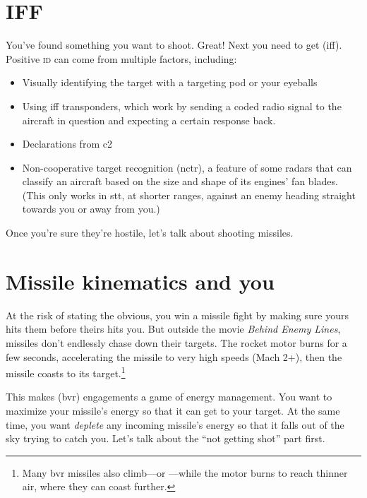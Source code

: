 \section{IFF}

You've found something you want to shoot. Great!
Next you need to get  \ac{(iff)}.
Positive \textsc{id} can come from multiple factors, including:
\begin{itemize}
\item Visually identifying the target with a targeting pod or your eyeballs
\item Using \ac{iff} transponders, which work by sending a coded radio signal
    to the aircraft in question and expecting a certain response back.
\item Declarations from \ac{c2}
\item Non-cooperative target recognition \ac{(nctr)},
    a feature of some radars that can classify an aircraft based
    on the size and shape of its engines' fan blades.
    (This only works in \ac{stt}, at shorter ranges,
    against an enemy heading straight towards you or away from you.)
\end{itemize}
Once you're sure they're hostile, let's talk about shooting missiles.

\section{Missile kinematics and you}

At the risk of stating the obvious, you win a missile fight by making sure yours
hits them before theirs hits you.
But outside the movie \emph{Behind Enemy Lines},
missiles don't endlessly chase down their targets.
The rocket motor burns for a few seconds,
accelerating the missile to very high speeds (Mach 2+),
then the missile coasts to its target.\punckern\footnote{Many
\ac{bvr} missiles also climb---or ---while the motor burns
to reach thinner air, where they can coast further.}

This makes  \ac{(bvr)} engagements
a game of energy management.
You want to maximize your missile's energy so that it can get to your target.
At the same time, you want \emph{deplete} any incoming missile's energy
so that it falls out of the sky trying to catch you.
Let's talk about the ``not getting shot'' part first.

